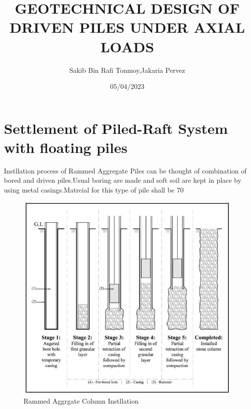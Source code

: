 \documentclass[12pt]{article}
\title{GEOTECHNICAL DESIGN OF DRIVEN PILES UNDER AXIAL LOADS}
\author{Sakib Bin Rafi Tonmoy,Jakaria Pervez}
\date{05/04/2023}
\begin{document}
\maketitle

\section{Settlement of Piled-Raft System with floating piles }
 Instllation process of Rammed Aggregate Piles can be thought of combination of bored and driven piles.Usual boring are made and soft soil are kept in place by using metal casings.Matreial for this type of pile shall be 70%
 
 
\begin{figure}
\centering
\includegraphics{stone-column-installation}
\caption{Rammed Aggrgate Column Instllation}
\label{fig:rammed_aggregate_column}
\end{figure}

\end{document}
